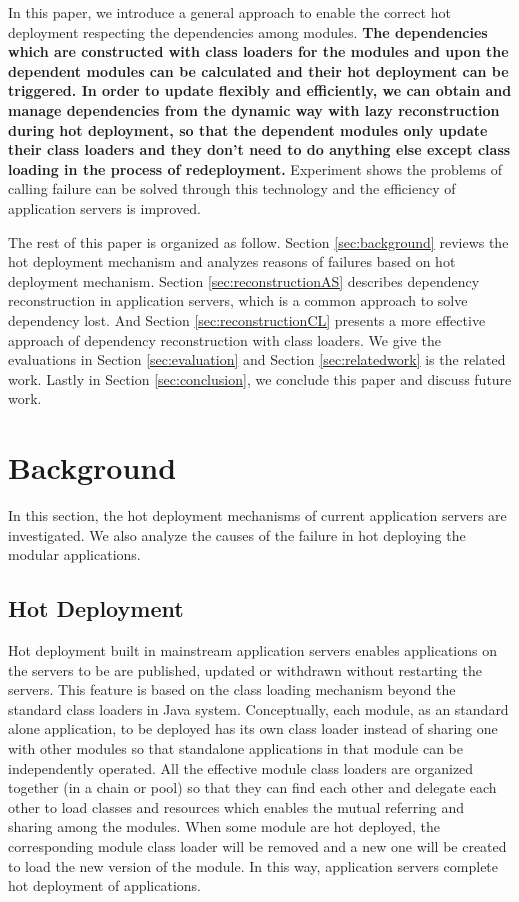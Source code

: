 \documentclass[conference]{IEEEtran}
\begin{document}
In this paper, we introduce a general approach to enable the correct hot deployment respecting the dependencies among modules. \textbf{The dependencies which are constructed with class loaders for the modules and upon the dependent modules can be calculated and their hot deployment can be triggered. In order to update flexibly and efficiently, we can obtain and manage dependencies from the dynamic way with lazy reconstruction during hot deployment, so that the dependent modules only update their class loaders and they don't need to do anything else except class loading in the process of redeployment. }Experiment shows the problems of calling failure can be solved through this technology and the efficiency of application servers is improved.

The rest of this paper is organized as follow. 
Section \ref{sec:background} reviews the hot deployment mechanism and analyzes reasons of failures based on hot deployment mechanism. 
Section \ref{sec:reconstructionAS} describes dependency reconstruction in application servers, which is a common approach to solve dependency lost.
And Section \ref{sec:reconstructionCL} presents a more effective approach of dependency reconstruction with class loaders.
We give the evaluations in Section \ref{sec:evaluation} and Section \ref{sec:relatedwork} is the related work.
Lastly in Section \ref{sec:conclusion}, we conclude this paper and discuss future work.



\section{Background\label{sec:background}}
In this section, the hot deployment mechanisms of current application servers are investigated. We also analyze the causes of the failure in hot deploying the modular applications.

\subsection{Hot Deployment}

Hot deployment built in mainstream application servers enables applications on the servers to be are published, updated or withdrawn without restarting the servers. This feature is based on the class loading mechanism beyond the standard class loaders\cite{standard_cl} in Java system. Conceptually, each module, as an standard alone application, to be deployed has its own class loader instead of sharing one with other modules so that standalone applications in that module can be independently operated. All the effective module class loaders are organized together (in a chain or pool) so that they can find each other and delegate each other to load classes and resources which enables the mutual referring and sharing among the modules. When some module are hot deployed, the corresponding module class loader will be removed and a new one will be created to load the new version of the module. In this way, application servers complete hot deployment of applications\cite{module_cl}.
\end{document}
